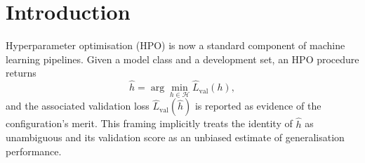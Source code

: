 \documentclass[twoside]{article}
\newcommand{\hhat}{\hat{h}}
\newcommand{\Lval}{\hat{L}_{\mathrm{val}}}
\begin{document}

\begin{abstract}
We study uncertainty in hyperparameter selection rather than only
uncertainty in estimated model performance. We introduce
\emph{$\varepsilon$-optimal-set coverage} (OSC), which measures how
frequently bootstrap-resampled HPO runs select configurations whose
validation performance lies within $\varepsilon$ of the original winner.
OSC captures \emph{performance-space stability} and is conceptually
distinct from exact winner stability, which tracks whether the same
configuration is selected. Across seven datasets and three model
classes, OSC is negatively associated with post-selection
validation-to-test gaps (Spearman $r=-0.48$, 95\,\% CI
$[-0.59,-0.37]$), with consistent sign but heterogeneous magnitude
(forest-plot slopes all negative; $I^2=86\,\%$). In a paired
randomised experiment, replacing the HPO winner with a
stability-weighted selection reduces the post-selection gap, with
substantially larger benefits when OSC is low (decisive statistic
$\Delta\Delta G = +0.041$, $p < 0.001$; interaction
$\hat\beta_{\mathrm{Treatment}\times\mathrm{OSC}} = +0.075$, 95\,\%
bootstrap CI $[+0.051, +0.098]$). These results suggest that reliability
of HPO should be assessed in performance space rather than solely through
exact configuration stability.
\end{abstract}

\section{Introduction}
\label{sec:intro}

Hyperparameter optimisation (HPO) is now a standard component of machine
learning pipelines. Given a model class and a development set, an HPO
procedure returns
\begin{equation}
  \hhat = \arg\min_{h \in \mathcal{H}} \Lval(h),
\end{equation}
and the associated validation loss $\Lval(\hhat)$ is reported as evidence
of the configuration's merit. This framing implicitly treats the identity
of $\hhat$ as unambiguous and its validation score as an unbiased
estimate of generalisation performance.
\end{document}
